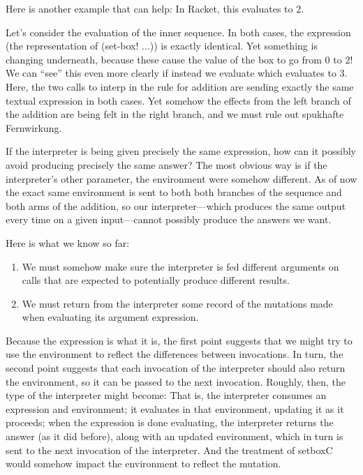 Here is another example that can help:
In Racket, this evaluates to 2.


Let’s consider the evaluation of the inner sequence. In both cases, the
expression (the representation of (set-box! ...)) is exactly identical. Yet
something is changing underneath, because these cause the value of the box to go
from 0 to 2! We can “see” this even more clearly if instead we evaluate
which evaluates to 3. Here, the two calls to interp in the rule for addition are
sending exactly the same textual expression in both cases. Yet somehow the
effects from the left branch of the addition are being felt in the right branch,
and we must rule out spukhafte Fernwirkung.

If the interpreter is being given precisely the same expression, how can it
possibly avoid producing precisely the same answer? The most obvious way is if
the interpreter’s other parameter, the environment were somehow different. As of
now the exact same environment is sent to both both branches of the sequence and
both arms of the addition, so our interpreter—which produces the same output
every time on a given input—cannot possibly produce the answers we want.

Here is what we know so far:
\begin{enumerate}[nosep]
  \item 
We must somehow make sure the interpreter is fed different arguments on calls
that are expected to potentially produce different results.
  \item 
We must return from the interpreter some record of the mutations made when
evaluating its argument expression.
\end{enumerate}

Because the expression is what it is, the first point suggests that we might try
to use the environment to reflect the differences between invocations. In turn,
the second point suggests that each invocation of the interpreter should also
return the environment, so it can be passed to the next invocation. Roughly,
then, the type of the interpreter might become:
That is, the interpreter consumes an expression and environment; it evaluates in
that environment, updating it as it proceeds; when the expression is done
evaluating, the interpreter returns the answer (as it did before), along with an
updated environment, which in turn is sent to the next invocation of the
interpreter. And the treatment of setboxC would somehow impact the environment
to reflect the mutation.

